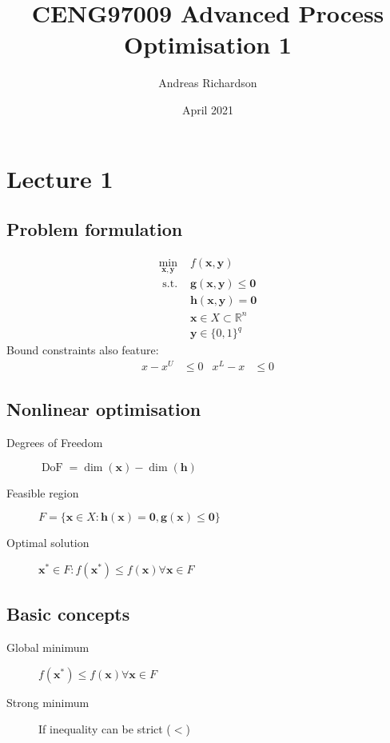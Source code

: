 \documentclass[a4paper,twocolumn,10pt]{article}
\title{CENG97009 Advanced Process Optimisation 1}
\author{Andreas Richardson}
\date{April 2021}
\begin{document}
\maketitle


\section{Lecture 1}

\subsection{Problem formulation}
\begin{equation}
\begin{array}{cc}
\min_{\boldsymbol{x}, \boldsymbol{y}}     & f(\boldsymbol{x}, \boldsymbol{y}) \\
\text { s.t. }  & \boldsymbol{g}(\boldsymbol{x}, \boldsymbol{y}) \leq \mathbf{0} \\
                & \boldsymbol{h}(\boldsymbol{x}, \boldsymbol{y}) = \mathbf{0} \\
                & \boldsymbol{x} \in X \subset \mathbb{R}^{n} \\
                & \boldsymbol{y} \in\{0,1\}^{q}
\end{array}
\end{equation}
Bound constraints also feature:
\begin{align}
    x-x^{U} &\leq 0 & x^{L}-x &\leq 0
\end{align}

\subsection{Nonlinear optimisation}
\begin{description}
    \item[Degrees of Freedom] $\operatorname{DoF}=\operatorname{dim}(\boldsymbol{x})-\operatorname{dim}(\boldsymbol{h})$
    \item[Feasible region] $F=\{\boldsymbol{x} \in X: \boldsymbol{h}(\boldsymbol{x})=\mathbf{0}, \boldsymbol{g}(\boldsymbol{x}) \leq \mathbf{0}\}$
    \item[Optimal solution] $\boldsymbol{x}^{*} \in F: f\left(\boldsymbol{x}^{*}\right) \leq f(\boldsymbol{x}) \forall \boldsymbol{x} \in F$ 
\end{description}

\subsection{Basic concepts}
\begin{description}
    \item[Global minimum] $f\left(\boldsymbol{x}^{*}\right) \leq f(\boldsymbol{x}) \forall \boldsymbol{x} \in F$ 
    \item[Strong minimum] If inequality can be strict ($<$)
\end{description}
\end{document}
